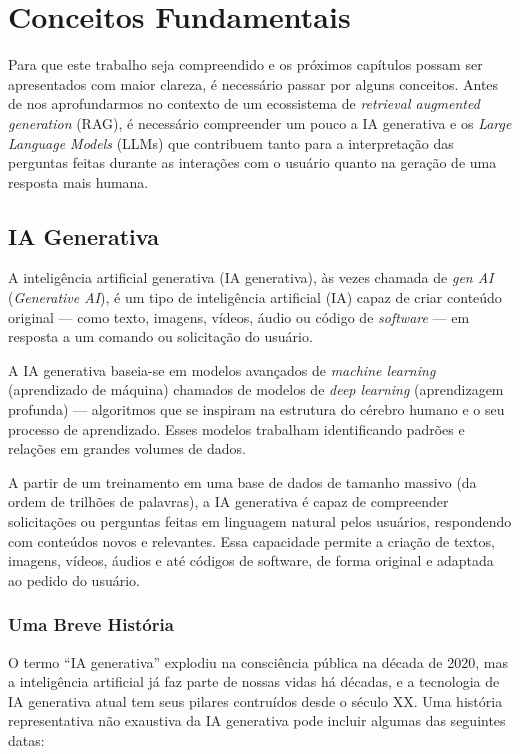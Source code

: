 \documentclass[a4paper, 12pt]{article}
\newcommand{\citeb}[1]{\bibleftbracket\cite{#1}\bibrightbracket}
\begin{document}
    \clearpage

    \section{Conceitos Fundamentais} \label{sec:concepts}

    Para que este trabalho seja compreendido e os próximos capítulos possam ser apresentados com maior clareza, é necessário passar por alguns conceitos. Antes de nos aprofundarmos no contexto de um ecossistema de \textit{retrieval augmented generation} (RAG), é necessário compreender um pouco a IA generativa e os \textit{Large Language Models} (LLMs) que contribuem tanto para a interpretação das perguntas feitas durante as interações com o usuário quanto na geração de uma resposta mais humana.

    \subsection{IA Generativa}
    
    A inteligência artificial generativa (IA generativa), às vezes chamada de \textit{gen AI} (\textit{Generative AI}), é um tipo de inteligência artificial (IA) capaz de criar conteúdo original — como texto, imagens, vídeos, áudio ou código de \textit{software} — em resposta a um comando ou solicitação do usuário. \citeb{genai_ibm}

    A IA generativa baseia-se em modelos avançados de \textit{machine learning} (aprendizado de máquina) chamados de modelos de \textit{deep learning} (aprendizagem profunda) — algoritmos que se inspiram na estrutura do cérebro humano e o seu processo de aprendizado. Esses modelos trabalham identificando padrões e relações em grandes volumes de dados.

    A partir de um treinamento em uma base de dados de tamanho massivo (da ordem de trilhões de palavras), a IA generativa é capaz de compreender solicitações ou perguntas feitas em linguagem natural pelos usuários, respondendo com conteúdos novos e relevantes. Essa capacidade permite a criação de textos, imagens, vídeos, áudios e até códigos de software, de forma original e adaptada ao pedido do usuário.


    \subsubsection{Uma Breve História}

    O termo ``IA generativa'' explodiu na consciência pública na década de 2020, mas a inteligência artificial já faz parte de nossas vidas há décadas, e a tecnologia de IA generativa atual tem seus pilares contruídos desde o século XX. Uma história representativa não exaustiva da IA generativa pode incluir algumas das seguintes datas:
\end{document}

